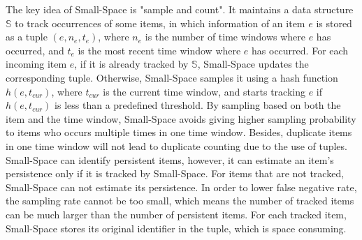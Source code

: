 The key idea of Small-Space is "sample and count". 
It maintains a data structure $\mathbb{S}$ to track occurrences of some items, in which information of an item $e$ is stored as a tuple $(e, n_e, t_e)$, where $n_e$ is the number of time windows where $e$ has occurred, and $t_e$ is the most recent time window where $e$ has occurred.
For each incoming item $e$, if it is already tracked by $\mathbb{S}$, Small-Space updates the corresponding tuple.
Otherwise, Small-Space samples it using a hash function $h(e, t_{cur})$, where $t_{cur}$ is the current time window, and starts tracking $e$ if $h(e, t_{cur})$ is less than a predefined threshold.
By sampling based on both the item and the time window, Small-Space avoids giving higher sampling probability to items who occurs multiple times in one time window.
Besides, duplicate items in one time window will not lead to duplicate counting due to the use of tuples.
Small-Space can identify persistent items, however, it can estimate an item's persistence only if it is tracked by Small-Space.
For items that are not tracked, Small-Space can not estimate its persistence.
In order to lower false negative rate, the sampling rate cannot be too small, which means the number of tracked items can be much larger than the number of persistent items. 
For each tracked item, Small-Space stores its original identifier in the tuple, which is space consuming.






